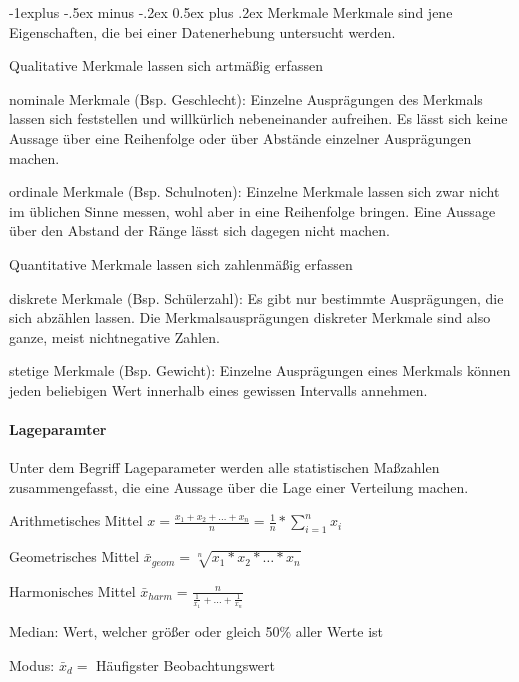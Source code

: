\documentclass[a4paper]{article}
\makeatletter
\renewcommand{\subsection}{\@startsection{subsection}{2}{0mm}%
                                {-1explus -.5ex minus -.2ex}%
                                {0.5ex plus .2ex}%
                                {\normalfont\normalsize\bfseries}}
\makeatother
\begin{document}
\begin{multicols}{3}
  \subsection{Merkmale}
  Merkmale sind jene Eigenschaften, die bei einer Datenerhebung untersucht werden.
  \begin{itemize*}
    \item Qualitative Merkmale lassen sich artmäßig erfassen
    \begin{itemize*}
      \item nominale Merkmale (Bsp. Geschlecht): Einzelne Ausprägungen des Merkmals lassen sich feststellen und willkürlich nebeneinander aufreihen. Es lässt sich keine Aussage über eine Reihenfolge oder über Abstände einzelner Ausprägungen machen.
      \item ordinale Merkmale (Bsp. Schulnoten): Einzelne Merkmale lassen sich zwar nicht im üblichen Sinne messen, wohl aber in eine Reihenfolge bringen. Eine Aussage über den Abstand der Ränge lässt sich dagegen nicht machen.
    \end{itemize*}
    \item Quantitative Merkmale lassen sich zahlenmäßig erfassen
    \begin{itemize*}
      \item diskrete Merkmale (Bsp. Schülerzahl): Es gibt nur bestimmte Ausprägungen, die sich abzählen lassen. Die Merkmalsausprägungen diskreter Merkmale sind also ganze, meist nichtnegative Zahlen.
      \item stetige Merkmale (Bsp. Gewicht): Einzelne Ausprägungen eines Merkmals können jeden beliebigen Wert innerhalb eines gewissen Intervalls annehmen.
    \end{itemize*}
  \end{itemize*}

  \paragraph{Lageparamter}
  Unter dem Begriff Lageparameter werden alle statistischen Maßzahlen zusammengefasst, die eine Aussage über die Lage einer Verteilung machen.
  \begin{itemize*}
    \item Arithmetisches Mittel $x=\frac{x_1+x_2+\dots+x_n}{n}=\frac{1}{n}*\sum_{i=1}^n x_i$
    \item Geometrisches Mittel $\bar{x}_{geom} = \sqrt[n]{x_1*x_2*\dots*x_n}$
    \item Harmonisches Mittel $\bar{x}_{harm} = \frac{n}{\frac{1}{x_1}+\dots+\frac{1}{x_n}}$
    \item Median: Wert, welcher größer oder gleich 50\% aller Werte ist
    \item Modus: $\bar{x}_d=$ Häufigster Beobachtungswert
  \end{itemize*}


\end{multicols}
\end{document}
